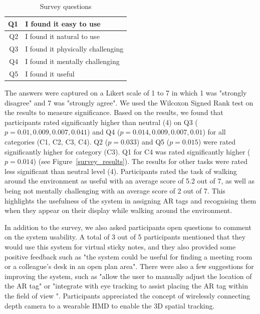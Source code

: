 \begin{table}[ht]
  \centering
	\caption{Survey questions}
    \label{table:questions}
    \begin{tabular}{r l}
    \hline
    Q1 & I found it easy to use \\ \hline
    Q2 & I found it natural to use \\ \hline
    Q3 & I found it physically challenging \\ \hline
    Q4 & I found it mentally challenging \\ \hline
    Q5 & I found it useful \\ \hline
    \end{tabular}
\end{table}

The answers were captured on a Likert scale of 1 to 7 in which 1 was "strongly disagree" and 7 was "strongly agree". We used the Wilcoxon Signed Rank test on the results to measure significance. Based on the results, we found that participants rated significantly higher than neutral (4) on Q3 ($p=0.01, 0.009, 0.007, 0.041$) and Q4 ($p=0.014, 0.009, 0.007, 0.01$) for all categories (C1, C2, C3, C4). Q2 ($p=0.033$) and Q5 ($p=0.015$) were rated significantly higher for category (C3). Q1 for C4 was rated significantly higher ($p=0.014$) (see Figure~\ref{survey_results}). The results  for other tasks were rated less significant than neutral level (4). Participants rated the task of walking around the environment as useful with an average score of 5.2 out of 7, as well as being not mentally challenging with an average score of 2 out of 7. This highlights the usefulness of the system in assigning AR tags and recognising them when they appear on their display while walking around the environment. 

In addition to the survey, we also asked participants open questions to comment on the system usability. A total of 3 out of 5 participants mentioned that they would use this system for virtual sticky notes, and they also provided some positive feedback such as "the system could be useful for finding a meeting room or a colleague's desk in an open plan area". There were also a few suggestions for improving the system, such as "allow the user to manually adjust the location of the AR tag" or "integrate with eye tracking to assist placing the AR tag within the field of view ". Participants appreciated  the concept of wirelessly connecting depth camera to a wearable HMD to enable the 3D spatial tracking.    


